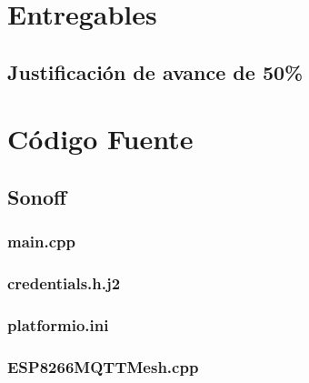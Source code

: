 \chapter{Entregables}


\section{Justificación de avance de 50\%}







\chapter{Código Fuente} \label{anexo-codigo-fuente}



\section{Sonoff} \label{anexo-sonoff}



\subsection{main.cpp} \label{anexo-esp-main}



\subsection{credentials.h.j2} \label{anexo-credentials}



\subsection{platformio.ini}



\subsection{ESP8266MQTTMesh.cpp} \label{anexo-esp8266mqttmesh}





